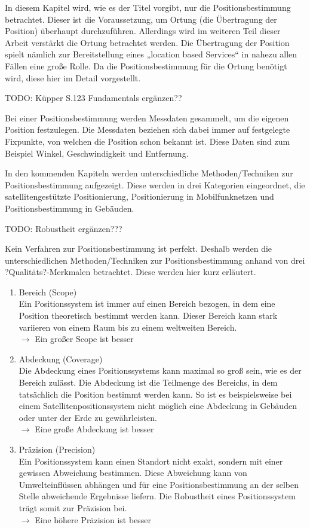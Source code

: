 In diesem Kapitel wird, wie es der Titel vorgibt, nur die Positionsbestimmung betrachtet. Dieser ist die Voraussetzung, um Ortung (die Übertragung der Position) überhaupt durchzuführen. Allerdings wird im weiteren Teil dieser Arbeit verstärkt die Ortung betrachtet werden. Die Übertragung der Position spielt nämlich zur Bereitstellung eines „location based Services“ in nahezu allen Fällen eine große Rolle. Da die Positionsbestimmung für die Ortung benötigt wird, diese hier im Detail vorgestellt.

TODO: Küpper S.123
Fundamentals ergänzen??

Bei einer Positionsbestimmung werden Messdaten gesammelt, um die eigenen Position festzulegen. Die Messdaten beziehen sich dabei immer auf festgelegte Fixpunkte, von welchen die Position schon bekannt ist.  Diese Daten sind zum Beispiel Winkel, Geschwindigkeit und Entfernung.

In den kommenden Kapiteln werden unterschiedliche Methoden/Techniken zur Positionsbestimmung aufgezeigt. Diese werden in drei Kategorien eingeordnet, die satellitengestützte Positionierung, Positionierung in Mobilfunknetzen und Positionsbestimmung in Gebäuden.

TODO: Robustheit ergänzen???

Kein Verfahren zur Positionsbestimmung ist perfekt. 
Deshalb werden die unterschiedlichen Methoden/Techniken zur Positionsbestimmung anhand von drei ?Qualitäts?-Merkmalen betrachtet. Diese werden hier kurz erläutert.

\begin{enumerate}
\item Bereich (Scope)\\
Ein Positionssystem ist immer auf einen Bereich bezogen, in dem eine Position theoretisch bestimmt werden kann. Dieser Bereich kann stark variieren von einem Raum bis zu einem weltweiten Bereich.\\
$\longrightarrow$ Ein großer Scope ist besser
\item Abdeckung (Coverage)\\
Die Abdeckung eines Positionssystems kann maximal so groß sein, wie es der Bereich zulässt. Die Abdeckung ist die Teilmenge des Bereichs, in dem tatsächlich die Position bestimmt werden kann. So ist es beispielsweise bei einem Satellitenpositionssystem nicht möglich eine Abdeckung in Gebäuden oder unter der Erde zu gewährleisten.\\
$\longrightarrow$ Eine große Abdeckung ist besser
\item Präzision (Precision)\\
Ein Positionssystem kann einen Standort nicht exakt, sondern mit einer gewissen Abweichung bestimmen. Diese Abweichung kann von Umwelteinflüssen abhängen und für eine Positionsbestimmung an der selben Stelle abweichende Ergebnisse liefern. Die Robustheit eines Positionssystem trägt somit zur Präzision bei. \\
$\longrightarrow$ Eine höhere Präzision ist besser
\end{enumerate}
\cite[S.183]{Schiller2004}


